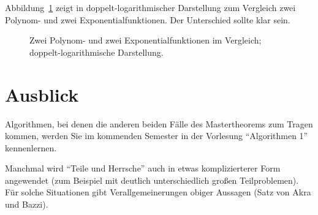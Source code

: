Abbildung~\ref{fig:wachstum-exp} zeigt in doppelt-logarithmischer
Darstellung zum Vergleich zwei Polynom- und zwei
Exponentialfunktionen. Der Unterschied sollte klar sein.

\begin{figure}[ht]
  \centering

  \caption{Zwei Polynom- und zwei Exponentialfunktionen im Vergleich;
    doppelt-logarithmische Darstellung.}
  \label{fig:wachstum-exp}
\end{figure}

\section{Ausblick}

Algorithmen, bei denen die anderen beiden Fälle des Mastertheorems zum
Tragen kommen, werden Sie im kommenden Semester in der Vorlesung
"`Algorithmen 1"' kennenlernen. 

Manchmal wird "`Teile und Herrsche"' auch in etwas komplizierterer
Form angewendet (zum Beispiel mit deutlich unterschiedlich großen
Teilproblemen). Für solche Situationen gibt Verallgemeinerungen obiger
Aussagen (Satz von Akra und Bazzi).

\printunitbibliography

\cleardoublepage

